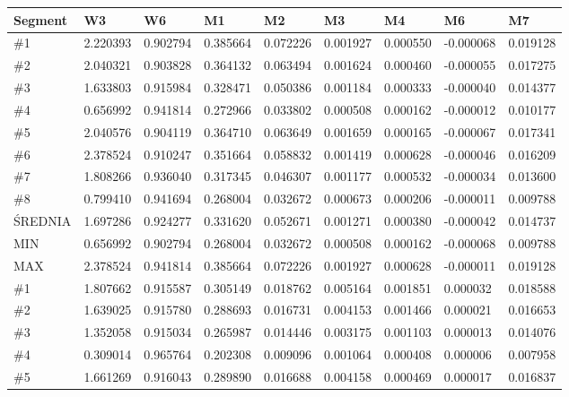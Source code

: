 \documentclass[12pt, oneside, final]{report}
\begin{document}
\begin{table}[ht!]
	\footnotesize
	\begin{tabu}{|l|l|l|l|l|l|l|l|l|}
		\hline
		Segment & W3 & W6 & M1 & M2 & M3 & M4 & M6 & M7\\
		\hline
		\textcolor{fed}{\#1} & 2.220393 & 0.902794 & 0.385664 & 0.072226 & 0.001927 & 0.000550 & -0.000068 & 0.019128\\
		\textcolor{fed}{\#2} & 2.040321 & 0.903828 & 0.364132 & 0.063494 & 0.001624 & 0.000460 & -0.000055 & 0.017275\\
		\textcolor{fed}{\#3} & 1.633803 & 0.915984 & 0.328471 & 0.050386 & 0.001184 & 0.000333 & -0.000040 & 0.014377\\
		\textcolor{fed}{\#4} & 0.656992 & 0.941814 & 0.272966 & 0.033802 & 0.000508 & 0.000162 & -0.000012 & 0.010177\\
		\textcolor{fed}{\#5} & 2.040576 & 0.904119 & 0.364710 & 0.063649 & 0.001659 & 0.000165 & -0.000067 & 0.017341\\
		\textcolor{fed}{\#6} & 2.378524 & 0.910247 & 0.351664 & 0.058832 & 0.001419 & 0.000628 & -0.000046 & 0.016209\\
		\textcolor{fed}{\#7} & 1.808266 & 0.936040 & 0.317345 & 0.046307 & 0.001177 & 0.000532 & -0.000034 & 0.013600\\
		\textcolor{fed}{\#8} & 0.799410 & 0.941694 & 0.268004 & 0.032672 & 0.000673 & 0.000206 & -0.000011 & 0.009788\\
		\hline
		ŚREDNIA & 1.697286 & 0.924277 & 0.331620 & 0.052671 & 0.001271 & 0.000380 & -0.000042 & 0.014737\\
		\hline
		MIN & 0.656992 & 0.902794 & 0.268004 & 0.032672 & 0.000508 & 0.000162 & -0.000068 & 0.009788\\
		\hline
		MAX & 2.378524 & 0.941814 & 0.385664 & 0.072226 & 0.001927 & 0.000628 & -0.000011 & 0.019128\\\tabucline[2pt]{-}
		\textcolor{ex}{\#1} & 1.807662 & 0.915587 & 0.305149 & 0.018762 & 0.005164 & 0.001851 & 0.000032 & 0.018588\\
		\textcolor{ex}{\#2} & 1.639025 & 0.915780 & 0.288693 & 0.016731 & 0.004153 & 0.001466 & 0.000021 & 0.016653\\
		\textcolor{ex}{\#3} & 1.352058 & 0.915034 & 0.265987 & 0.014446 & 0.003175 & 0.001103 & 0.000013 & 0.014076\\
		\textcolor{ex}{\#4} & 0.309014 & 0.965764 & 0.202308 & 0.009096 & 0.001064 & 0.000408 & 0.000006 & 0.007958\\
		\textcolor{ex}{\#5} & 1.661269 & 0.916043 & 0.289890 & 0.016688 & 0.004158 & 0.000469 & 0.000017 & 0.016837\\

\end{tabu}
\end{table}
\end{document}
